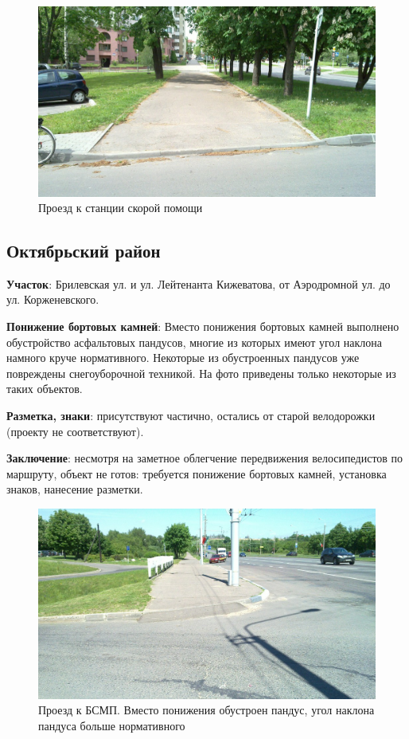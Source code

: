 \documentclass[a4paper,14pt,twoside]{extarticle}
\renewcommand\emph[1]{\textbf{#1}}
\begin{document}
\begin{figure}[h!]
    \centering
    \includegraphics[width=\textwidth]{Pictures/1000000000000A00000005A0FA048808.jpg}
    \caption{Проезд к станции скорой помощи}
\end{figure}

\clearpage
\newpage

\subsection*{Октябрьский район}%
\emph{Участок}: Брилевская ул. и ул. Лейтенанта Кижеватова, от Аэродромной ул. до ул. Корженевского.

\emph{Понижение бортовых камней}:
Вместо понижения бортовых камней выполнено обустройство асфальтовых пандусов, многие из которых имеют угол наклона намного круче нормативного. Некоторые из обустроенных пандусов уже повреждены снегоуборочной техникой. На фото приведены только некоторые из таких объектов.

\emph{Разметка, знаки}: присутствуют частично, остались от старой велодорожки (проекту не соответствуют).

\emph{Заключение}: несмотря на заметное облегчение передвижения велосипедистов по маршруту, объект не готов: требуется понижение бортовых камней, установка знаков, нанесение разметки.

\begin{figure}[h!]
    \centering
    \includegraphics[width=\textwidth]{Pictures/1000000000000A00000005A0A7D8B156.jpg}
    \caption{Проезд к БСМП. Вместо понижения обустроен пандус, угол наклона пандуса больше нормативного}
\end{figure}
\end{document}
